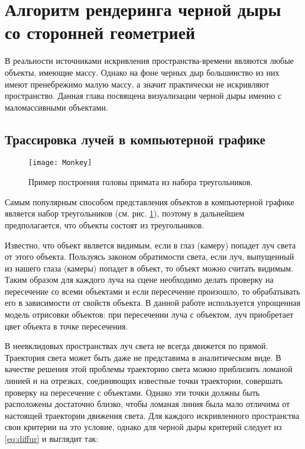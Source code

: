 \section{Алгоритм рендеринга черной дыры со сторонней геометрией}
\label{sec:Chapter3} 

В реальности источниками искривления пространства-времени являются любые объекты, имеющие массу. Однако на фоне черных дыр большинство из них имеют пренебрежимо малую массу, а значит практически не искривляют пространство. Данная глава посвящена визуализации черной дыры именно с маломассивными объектами.

\subsection{Трассировка лучей в компьютерной графике}

\begin{figure}[h]
    \centering
    \texttt{[image: Monkey]}
    \caption{Пример построения головы примата из набора треугольников.}
    \label{fig:monkey}
\end{figure}

Самым популярным способом представления объектов в компьютерной графике является набор треугольников (см. рис. \ref{fig:monkey}), поэтому в дальнейшем предполагается, что объекты состоят из треугольников.

Известно, что объект является видимым, если в глаз (камеру) попадет луч света от этого объекта. Пользуясь законом обратимости света, если луч, выпущенный из нашего глаза (камеры) попадет в объект, то объект можно считать видимым. Таким образом для каждого луча на сцене необходимо делать проверку на пересечение со всеми объектами и если пересечение произошло, то обрабатывать его в зависимости от свойств объекта. В данной работе используется упрощенная модель отрисовки объектов: при пересечении луча с объектом, луч приобретает цвет объекта в точке пересечения.

В неевклидовых пространствах луч света не всегда движется по прямой. Траектория света может быть даже не представима в аналитическом виде. В качестве решения этой проблемы траекторию света можно приблизить ломаной линией и на отрезках, соединяющих известные точки траектории, совершать проверку на пересечение с объектами. Однако эти точки должны быть расположены достаточно близко, чтобы ломаная линия была мало отличима от настоящей траектории движения света. Для каждого искривленного пространства свои критерии на это условие, однако для черной дыры критерий следует из \eqref{eq:diffur} и выглядит так:

